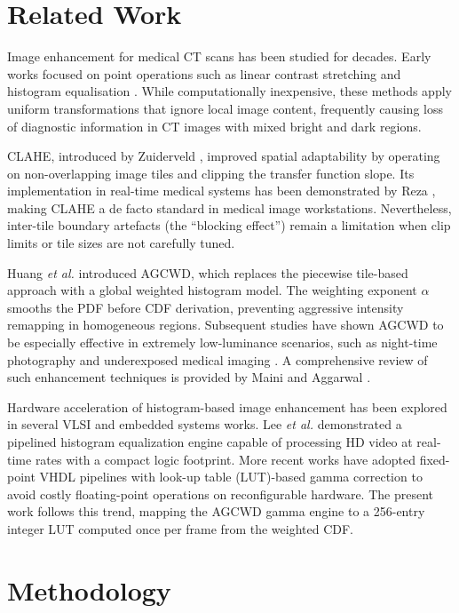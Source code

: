 \documentclass[conference]{IEEEtran}
\begin{document}
\section{Related Work}
\label{sec:related}

Image enhancement for medical CT scans has been studied for decades. Early works focused on point operations such as linear contrast stretching and histogram equalisation \cite{ref3}. While computationally inexpensive, these methods apply uniform transformations that ignore local image content, frequently causing loss of diagnostic information in CT images with mixed bright and dark regions.

CLAHE, introduced by Zuiderveld \cite{ref2}, improved spatial adaptability by operating on non-overlapping image tiles and clipping the transfer function slope. Its implementation in real-time medical systems has been demonstrated by Reza \cite{ref3}, making CLAHE a de facto standard in medical image workstations. Nevertheless, inter-tile boundary artefacts (the ``blocking effect'') remain a limitation when clip limits or tile sizes are not carefully tuned.

Huang \textit{et al.} \cite{ref1} introduced AGCWD, which replaces the piecewise tile-based approach with a global weighted histogram model. The weighting exponent $\alpha$ smooths the PDF before CDF derivation, preventing aggressive intensity remapping in homogeneous regions. Subsequent studies have shown AGCWD to be especially effective in extremely low-luminance scenarios, such as night-time photography and underexposed medical imaging \cite{ref4}. A comprehensive review of such enhancement techniques is provided by Maini and Aggarwal \cite{ref_survey}.

Hardware acceleration of histogram-based image enhancement has been explored in several VLSI and embedded systems works. Lee \textit{et al.} \cite{ref5} demonstrated a pipelined histogram equalization engine capable of processing HD video at real-time rates with a compact logic footprint. More recent works have adopted fixed-point VHDL pipelines with look-up table (LUT)-based gamma correction to avoid costly floating-point operations on reconfigurable hardware. The present work follows this trend, mapping the AGCWD gamma engine to a 256-entry integer LUT computed once per frame from the weighted CDF.
\section{Methodology}
\label{sec:methodology}
\end{document}
